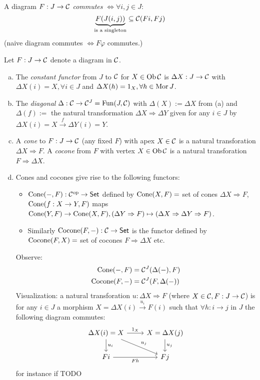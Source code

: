 \documentclass[a4paper]{report}
\begin{document}
\begin{defi}
  A diagram $F: J \to \mathcal{C}$ \emph{commutes} $\iff \forall i, j \in J$: \[\underbrace{F(J(i,j))}_{\text{is a singleton}} \subseteq \mathcal{C}(F i, Fj)\]
  (naive diagram commutes $\iff F\varphi$ commutes.)
\end{defi}
\begin{defi} Let $F: J \to \mathcal{C}$ denote a diagram in $\mathcal{C}$.
  \begin{enumerate}[(a)]
    \item The \emph{constant functor} from $J$ to $\mathcal{C}$ for $X \in \operatorname{Ob} \mathcal{C}$ is $\Delta X: J \to \mathcal{C}$ with $\Delta X(i) = X, \forall i \in J$ and $\Delta X(h) = 1_{X}, \forall h \in \operatorname{Mor} J$.
    \item The \emph{diagonal} $\Delta: \mathcal{C} \to \mathcal{C}^{J} = \operatorname{Fun}(J, \mathcal{C})$ with $\Delta(X) := \Delta X$ from (a) and $\Delta(f):= $ the natural transformation $\Delta X \Rightarrow \Delta Y$ given for any $i \in J$ by $\Delta X(i) = X \xrightarrow f \Delta Y(i) = Y$.
    \item A \emph{cone} to $F: J \to \mathcal{C}$ (any fixed $F$) with apex $X \in \mathcal{C}$ is a natural transforation $\Delta X \Rightarrow F$. A \emph{cocone} from $F$ with vertex $X \in \operatorname{Ob} \mathcal{C}$ is a natural transforation $F \Rightarrow \Delta X$.
    \item Cones and cocones give rise to the following functors:
\begin{itemize}
  \item $\operatorname{Cone}(-, F): \mathcal{C}^\mathrm{op} \to \mathsf{Set}$ defined by $\operatorname{Cone}(X,F) = $ set of cones  $\Delta X \Rightarrow F$, $\operatorname{Cone}(f: X \to Y, F)$ maps $\operatorname{Cone}(Y,F) \to \operatorname{Cone}(X,F), (\Delta Y \Rightarrow F) \mapsto (\Delta X \Rightarrow \Delta Y \Rightarrow F)$.
        \item Similarly $\operatorname{Cocone}(F, -): \mathcal{C} \to \mathsf{Set}$ is the functor defined by $\operatorname{Cocone}(F, X) =$ set of cocones $F \Rightarrow \Delta X$ etc.
\end{itemize}
          Observe: \begin{align*}
            \operatorname{Cone}(-,F) &= \mathcal{C}^{J}(\Delta(-),F)\\
            \operatorname{Cocone}(F,-) &= \mathcal{C}^{J}(F, \Delta(-))
          \end{align*}
          Visualization: a natural transforation $u: \Delta X \Rightarrow F$ (where $X \in\mathcal{C}, F: J \to \mathcal{C}$) is for any $i \in J$ a morphism $X = \Delta X(i) \xrightarrow{u_{i}} F(i)$ such that $\forall h: i \to j$ in $J$ the following diagram commutes:
          \[\begin{tikzcd}
\Delta X(i) = X \arrow[d, "u_i"] \arrow[rd, "u_j"] \arrow[r, "1_X"] & X = \Delta X(j) \arrow[d, "u_j"] \\
Fi \arrow[r, "Fh"']                                                 & Fj
\end{tikzcd}\]
          for instance if TODO
  \end{enumerate}
\end{defi}
\end{document}
